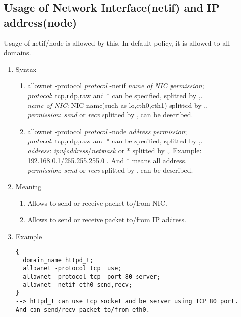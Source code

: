 \documentclass{article}
\begin{document}
\subsection{Usage of Network Interface(netif) and IP address(node)}
Usage of netif/node is allowed by this. In default policy, it is allowed
to all domains.
\begin{enumerate}
 \item Syntax\\
       \begin{enumerate}
	\item allownet -protocol {\it protocol} -netif {\it name of NIC} {\it
	      permission};\\
	      {\it protocol}: tcp,udp,raw and * can be specified, splitted by ,.\\
	      {\it name of NIC}: NIC name(such as lo,eth0,eth1) splitted by ,.\\
	      {\it permission}: {\it send} or {\it recv} splitted by , can
	      be described.       
	\item allownet -protocol {\it protocol} -node {\it address} {\it
	      permission};\\
	      {\it protocol}: tcp,udp,raw and * can be specified, splitted by ,.\\
	      {\it address}: {\it ipv4address}/{\it netmask} or * splitted by
	      ,. Example: 192.168.0.1/255.255.255.0 . And * means all address.\\
	      {\it permission}: {\it send} or {\it recv} splitted by , can
	      be described. 
       \end{enumerate}
 \item Meaning\\
       \begin{enumerate}
	\item    Allows to send or receive packet to/from NIC. 
	\item  Allows to send or receive packet to/from IP address. 
       \end{enumerate}
 \item Example\\

\begin{verbatim}
{
  domain_name httpd_t;
  allownet -protocol tcp  use;
  allownet -protocol tcp -port 80 server;
  allownet -netif eth0 send,recv;
}
--> httpd_t can use tcp socket and be server using TCP 80 port.
And can send/recv packet to/from eth0.
\end{verbatim}
\end{enumerate}
\end{document}
